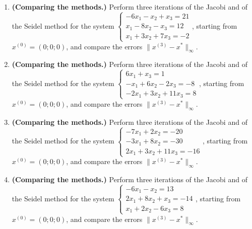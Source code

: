 \begin{enumerate}[label=\arabic*., leftmargin=*]
\item \textbf{(Comparing the methods.)} Perform three iterations of the Jacobi and of the Seidel method for the system $\begin{cases}-6x_1-x_2+x_3=21\\x_1-8x_2-x_3=12\\x_1+3x_2+7x_3=-2\end{cases}$, starting from $x^{(0)}=(0;0;0)$, and compare the errors $\|x^{(3)}-x^*\|_\infty$.
\item \textbf{(Comparing the methods.)} Perform three iterations of the Jacobi and of the Seidel method for the system $\begin{cases}6x_1+x_3=1\\-x_1+6x_2-2x_3=-8\\-2x_1+3x_2+11x_3=8\end{cases}$, starting from $x^{(0)}=(0;0;0)$, and compare the errors $\|x^{(3)}-x^*\|_\infty$.
\item \textbf{(Comparing the methods.)} Perform three iterations of the Jacobi and of the Seidel method for the system $\begin{cases}-7x_1+2x_2=-20\\-3x_1+8x_2=-30\\2x_1+3x_2+11x_3=-16\end{cases}$, starting from $x^{(0)}=(0;0;0)$, and compare the errors $\|x^{(3)}-x^*\|_\infty$.
\item \textbf{(Comparing the methods.)} Perform three iterations of the Jacobi and of the Seidel method for the system $\begin{cases}-6x_1-x_2=13\\2x_1+8x_2+x_3=-14\\x_1+2x_2-6x_3=8\end{cases}$, starting from $x^{(0)}=(0;0;0)$, and compare the errors $\|x^{(3)}-x^*\|_\infty$.
\end{enumerate}

